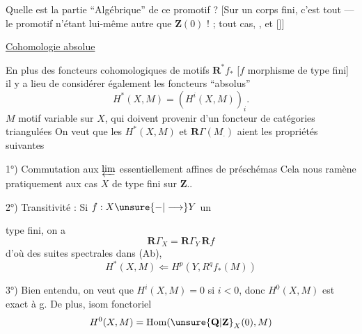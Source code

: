 Quelle est la partie ``Algébrique'' de ce promotif ? [Sur un corps fini, c'est tout --- le promotif n'étant lui-même autre que $\mathbf{Z}(0)$ ! ;  tout  cas,      , et   []]

\uline{Cohomologie absolue}

En plus des foncteurs cohomologiques de motifs $\mathbf{R}^{*}f_*$ [$f$ morphisme de type fini] il y a lieu de considérer également les foncteurs ``absolus''
\[
H^*(X,M)=(H^i(X,M))_i.
\]
$M$ motif variable sur $X$, qui doivent provenir d'un foncteur de catégories triangulées
On veut que les $H^*(X,M)$ et $\mathbf{R}\Gamma(M_\cdot)$ aient les propriétés suivantes

1°) Commutation aux $\varprojlim$ essentiellement affines de préschémas  
Cela nous ramène pratiquement aux cas $X$ de type fini sur $\mathbf{Z}$..

2°) Transitivité : Si $f:X\unsure{-|\longrightarrow}Y$ un



type fini, on a
\[
\mathbf{R}\Gamma_X=\mathbf{R}\Gamma_Y\,\mathbf{R}f
\]
d'où des suites spectrales dans (Ab),
\[
H^*(X,M)\Longleftarrow H^p(Y,R^qf_*(M))
\]

3°) Bien entendu, on veut que $H^i(X,M)=0$ si $i<0$, donc $H^0(X,M)$ est exact à g. De plus, isom fonctoriel
\[
H^0(X,M)=\mathrm{Hom}(\unsure{\mathbf{Q}|\mathbf{Z}}_X(0),M)
\]

